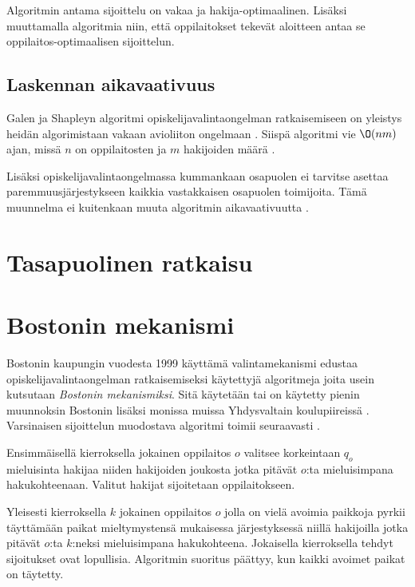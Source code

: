 \documentclass[gradu, twoside]{tktltiki}
\begin{document}
Algoritmin antama sijoittelu on vakaa ja hakija-optimaalinen. Lisäksi
muuttamalla algoritmia niin, että oppilaitokset tekevät aloitteen
antaa se oppilaitos-optimaalisen sijoittelun.\cite{galeshapley62}

\subsection{Laskennan aikavaativuus}

Galen ja Shapleyn algoritmi opiskelijavalintaongelman ratkaisemiseen
on yleistys heidän algorimistaan vakaan avioliiton ongelmaan
\cite[luku 1.6.3]{gusfield89}. Siispä algoritmi vie $\O(nm)$ ajan,
missä $n$ on oppilaitosten ja $m$ hakijoiden määrä \cite[sivu
  14]{gusfield89}.

Lisäksi opiskelijavalintaongelmassa kummankaan osapuolen ei tarvitse
asettaa paremmuusjärjestykseen kaikkia vastakkaisen osapuolen
toimijoita. Tämä muunnelma ei kuitenkaan muuta algoritmin
aikavaativuutta \cite{manlove02}.

\section{Tasapuolinen ratkaisu}

\section{Bostonin mekanismi}

Bostonin kaupungin vuodesta 1999 käyttämä valintamekanismi edustaa
opiskelijavalintaongelman ratkaisemiseksi käytettyjä algoritmeja joita
usein kutsutaan \emph{Bostonin mekanismiksi}. Sitä käytetään tai on
käytetty pienin muunnoksin Bostonin lisäksi monissa muissa
Yhdysvaltain koulupiireissä \cite{abdusön93}. Varsinaisen sijoittelun
muodostava algoritmi toimii seuraavasti \cite{abdusön93}.

Ensimmäisellä kierroksella jokainen oppilaitos $o$ valitsee
korkeintaan $q_o$ mieluisinta hakijaa niiden hakijoiden joukosta jotka
pitävät $o$:ta mieluisimpana hakukohteenaan. Valitut hakijat
sijoitetaan oppilaitokseen.

Yleisesti kierroksella $k$ jokainen oppilaitos $o$ jolla on vielä
avoimia paikkoja pyrkii täyttämään paikat mieltymystensä mukaisessa
järjestyksessä niillä hakijoilla jotka pitävät $o$:ta $k$:neksi
mieluisimpana hakukohteena. Jokaisella kierroksella tehdyt sijoitukset
ovat lopullisia. Algoritmin suoritus päättyy, kun kaikki avoimet
paikat on täytetty.
\end{document}
